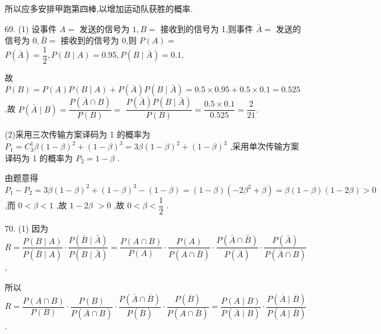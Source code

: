 所以应多安排甲跑第四棒,以增加运动队获胜的概率.

69. (1) 设事件 $A =$ 发送的信号为 $1,B =$ 接收到的信号为 1,则事件 $\bar{A} =$ 发送的信号为 $0,\bar{B} =$ 接收到的信号为 0,则 $P\left( A\right)  =$  $P\left( \bar{A}\right)  = \dfrac{1}{2},P\left( {B \mid  A}\right)  = {0.95},P\left( {B \mid  \bar{A}}\right)  = {0.1},$

故 $P\left( B\right)  = P\left( A\right) P\left( {B \mid  A}\right)  + P\left( \bar{A}\right) P\left( {B \mid  \bar{A}}\right)  = {0.5} \times  {0.95} + {0.5} \times  {0.1} = {0.525}$ ,故 $P\left( {\bar{A} \mid  B}\right)  = \dfrac{P\left( {\bar{A} \cap  B}\right) }{P\left( B\right) } =$  $\dfrac{P\left( \bar{A}\right) P\left( {B \mid  \bar{A}}\right) }{P\left( B\right) } = \dfrac{{0.5} \times  {0.1}}{0.525} = \dfrac{2}{21}.$

(2)采用三次传输方案译码为 1 的概率为 ${P}_{1} = {C}_{3}^{1}\beta {\left( 1 - \beta \right) }^{2} + {\left( 1 - \beta \right) }^{3} = {3\beta }{\left( 1 - \beta \right) }^{2} + {\left( 1 - \beta \right) }^{3}$ ,采用单次传输方案译码为 1 的概率为 ${P}_{2} = 1 - \beta$ .

由题意得 ${P}_{1} - {P}_{2} = {3\beta }{\left( 1 - \beta \right) }^{2} + {\left( 1 - \beta \right) }^{3} - \left( {1 - \beta }\right)  = \left( {1 - \beta }\right) \left( {-2{\beta }^{2} + \beta }\right)  = \beta \left( {1 - \beta }\right) \left( {1 - {2\beta }}\right)  > 0$ ,而 $0 < \beta  < 1$ ,故 $1 - {2\beta }$  $> 0$ ,故 $0 < \beta  < \dfrac{1}{2}$ .

70. (1) 因为 $R = \dfrac{P\left( {B \mid  A}\right) }{P\left( {\bar{B} \mid  A}\right) } \cdot  \dfrac{P\left( {\bar{B} \mid  \bar{A}}\right) }{P\left( {B \mid  \bar{A}}\right) } = \dfrac{P\left( {A \cap  B}\right) }{P\left( A\right) } \cdot  \dfrac{P\left( A\right) }{P\left( {A \cap  \bar{B}}\right) } \cdot  \dfrac{P\left( {\bar{A} \cap  \bar{B}}\right) }{P\left( \bar{A}\right) } \cdot  \dfrac{P\left( \bar{A}\right) }{P\left( {\bar{A} \cap  B}\right) }$ ,

所以 $R = \dfrac{P\left( {A \cap  B}\right) }{P\left( B\right) } \cdot  \dfrac{P\left( B\right) }{P\left( {\overline{A} \cap  B}\right) } \cdot  \dfrac{P\left( {\overline{A} \cap  \overline{B}}\right) }{P\left( \overline{B}\right) } \cdot  \dfrac{P\left( \overline{B}\right) }{P\left( {A \cap  \overline{B}}\right) } = \dfrac{P\left( {A \mid  B}\right) }{P\left( {\overline{A} \mid  B}\right) } \cdot  \dfrac{P\left( {\overline{A} \mid  \overline{B}}\right) }{P\left( {A \mid  \overline{B}}\right) }$ .

